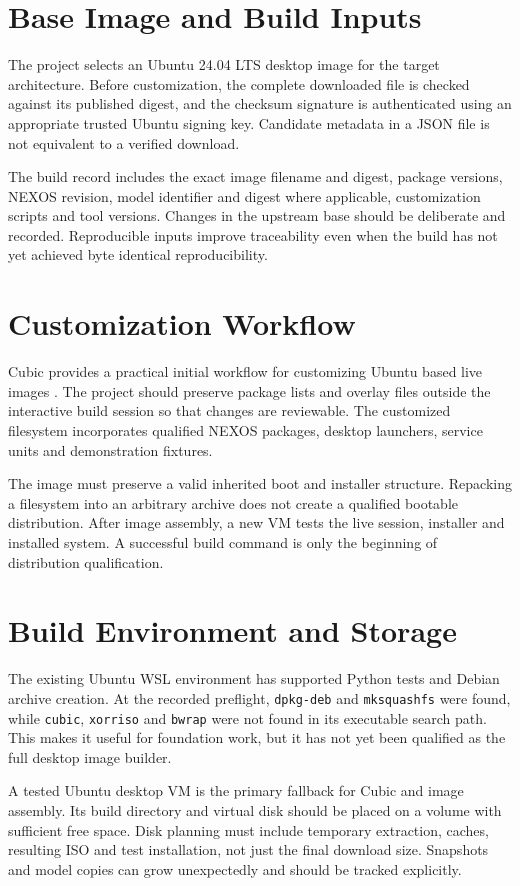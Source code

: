 \section{Base Image and Build Inputs}
The project selects an Ubuntu 24.04 LTS desktop image for the target architecture. Before customization, the complete downloaded file is checked against its published digest, and the checksum signature is authenticated using an appropriate trusted Ubuntu signing key. Candidate metadata in a JSON file is not equivalent to a verified download.

The build record includes the exact image filename and digest, package versions, NEXOS revision, model identifier and digest where applicable, customization scripts and tool versions. Changes in the upstream base should be deliberate and recorded. Reproducible inputs improve traceability even when the build has not yet achieved byte identical reproducibility.

\section{Customization Workflow}
Cubic provides a practical initial workflow for customizing Ubuntu based live images \cite{cubic}. The project should preserve package lists and overlay files outside the interactive build session so that changes are reviewable. The customized filesystem incorporates qualified NEXOS packages, desktop launchers, service units and demonstration fixtures.

The image must preserve a valid inherited boot and installer structure. Repacking a filesystem into an arbitrary archive does not create a qualified bootable distribution. After image assembly, a new VM tests the live session, installer and installed system. A successful build command is only the beginning of distribution qualification.

\section{Build Environment and Storage}
The existing Ubuntu WSL environment has supported Python tests and Debian archive creation. At the recorded preflight, \texttt{dpkg-deb} and \texttt{mksquashfs} were found, while \texttt{cubic}, \texttt{xorriso} and \texttt{bwrap} were not found in its executable search path. This makes it useful for foundation work, but it has not yet been qualified as the full desktop image builder.

A tested Ubuntu desktop VM is the primary fallback for Cubic and image assembly. Its build directory and virtual disk should be placed on a volume with sufficient free space. Disk planning must include temporary extraction, caches, resulting ISO and test installation, not just the final download size. Snapshots and model copies can grow unexpectedly and should be tracked explicitly.

